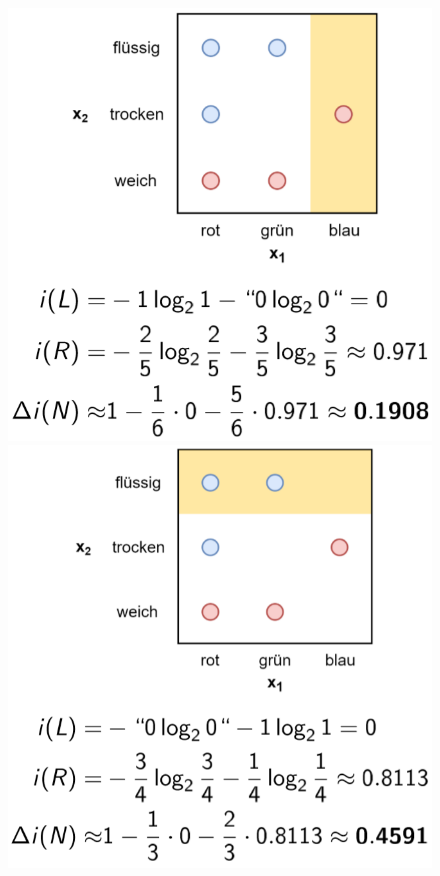 \documentclass{report}
\begin{document}
  \begin{figure}[H]	
    \centering	
    \begin{minipage}[b]{0.4\textwidth}	
      \includegraphics[scale=.235]{ml07_10}	
    \end{minipage}	
    \begin{minipage}[b]{0.4\textwidth}	
      \includegraphics[scale=.235]{ml07_11}	
    \end{minipage}	
  \end{figure}	
  
\end{document}
